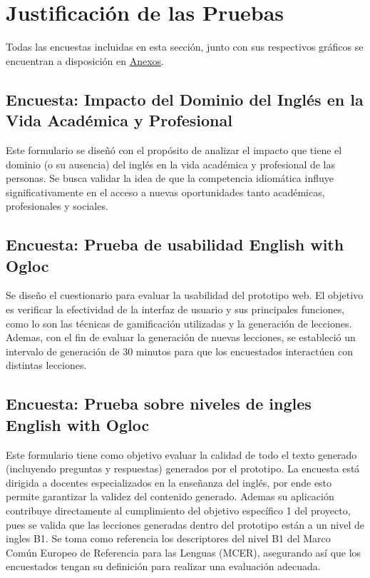 \section{Justificación de las Pruebas}

Todas las encuestas incluidas en esta sección, junto con sus respectivos gráficos se encuentran a disposición en \hyperref[Anexos]{Anexos}.

\subsection{Encuesta: Impacto del Dominio del Inglés en la Vida Académica y Profesional}

Este formulario se diseñó con el propósito de analizar el impacto que tiene el dominio (o su ausencia) del inglés en la vida académica y profesional de las personas. Se busca validar la idea de que la competencia idiomática influye significativamente en el acceso a nuevas oportunidades tanto académicas, profesionales y sociales.

\subsection{Encuesta: Prueba de usabilidad English with Ogloc}

Se diseño el cuestionario para evaluar la usabilidad del prototipo web. El objetivo es verificar la efectividad de la interfaz de usuario  y sus principales funciones, como lo son las técnicas de gamificación utilizadas y la generación de lecciones. Ademas, con el fin de evaluar la generación de nuevas lecciones, se estableció un intervalo de generación de 30 minutos para que los encuestados interactúen con distintas lecciones.

\subsection{Encuesta: Prueba sobre niveles de ingles English with Ogloc}

Este formulario tiene como objetivo evaluar la calidad de todo el texto generado (incluyendo preguntas y respuestas) generados por el prototipo. La encuesta está dirigida a docentes especializados en la enseñanza del inglés, por ende esto permite garantizar la validez del contenido generado. Ademas su  aplicación contribuye directamente al cumplimiento del objetivo específico 1 del proyecto, pues se valida que las lecciones generadas dentro del prototipo están a un nivel de ingles B1. Se toma como referencia los descriptores del nivel B1 del Marco Común Europeo de Referencia para las Lenguas (MCER), asegurando así que los encuestados tengan su definición para realizar una evaluación adecuada.

